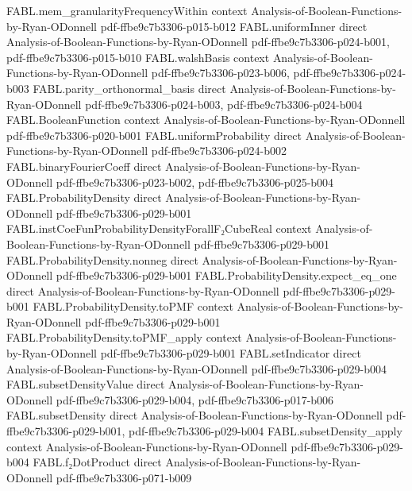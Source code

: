 \begin{theorem}
  {FABL.mem_granularityFrequencyWithin}
  {context}
  {Analysis-of-Boolean-Functions-by-Ryan-ODonnell}
  {pdf-ffbe9c7b3306-p015-b012}
\proofstep
  {FABL.uniformInner}
  {direct}
  {Analysis-of-Boolean-Functions-by-Ryan-ODonnell}
  {pdf-ffbe9c7b3306-p024-b001,
    pdf-ffbe9c7b3306-p015-b010}
\proofstep
  {FABL.walshBasis}
  {context}
  {Analysis-of-Boolean-Functions-by-Ryan-ODonnell}
  {pdf-ffbe9c7b3306-p023-b006,
    pdf-ffbe9c7b3306-p024-b003}
\proofstep
  {FABL.parity_orthonormal_basis}
  {direct}
  {Analysis-of-Boolean-Functions-by-Ryan-ODonnell}
  {pdf-ffbe9c7b3306-p024-b003,
    pdf-ffbe9c7b3306-p024-b004}
\proofstep
  {FABL.BooleanFunction}
  {context}
  {Analysis-of-Boolean-Functions-by-Ryan-ODonnell}
  {pdf-ffbe9c7b3306-p020-b001}
\proofstep
  {FABL.uniformProbability}
  {direct}
  {Analysis-of-Boolean-Functions-by-Ryan-ODonnell}
  {pdf-ffbe9c7b3306-p024-b002}
\proofstep
  {FABL.binaryFourierCoeff}
  {direct}
  {Analysis-of-Boolean-Functions-by-Ryan-ODonnell}
  {pdf-ffbe9c7b3306-p023-b002,
    pdf-ffbe9c7b3306-p025-b004}
\proofstep
  {FABL.ProbabilityDensity}
  {direct}
  {Analysis-of-Boolean-Functions-by-Ryan-ODonnell}
  {pdf-ffbe9c7b3306-p029-b001}
\proofstep
  {FABL.instCoeFunProbabilityDensityForallF₂CubeReal}
  {context}
  {Analysis-of-Boolean-Functions-by-Ryan-ODonnell}
  {pdf-ffbe9c7b3306-p029-b001}
\proofstep
  {FABL.ProbabilityDensity.nonneg}
  {direct}
  {Analysis-of-Boolean-Functions-by-Ryan-ODonnell}
  {pdf-ffbe9c7b3306-p029-b001}
\proofstep
  {FABL.ProbabilityDensity.expect_eq_one}
  {direct}
  {Analysis-of-Boolean-Functions-by-Ryan-ODonnell}
  {pdf-ffbe9c7b3306-p029-b001}
\proofstep
  {FABL.ProbabilityDensity.toPMF}
  {context}
  {Analysis-of-Boolean-Functions-by-Ryan-ODonnell}
  {pdf-ffbe9c7b3306-p029-b001}
\proofstep
  {FABL.ProbabilityDensity.toPMF_apply}
  {context}
  {Analysis-of-Boolean-Functions-by-Ryan-ODonnell}
  {pdf-ffbe9c7b3306-p029-b001}
\proofstep
  {FABL.setIndicator}
  {direct}
  {Analysis-of-Boolean-Functions-by-Ryan-ODonnell}
  {pdf-ffbe9c7b3306-p029-b004}
\proofstep
  {FABL.subsetDensityValue}
  {direct}
  {Analysis-of-Boolean-Functions-by-Ryan-ODonnell}
  {pdf-ffbe9c7b3306-p029-b004,
    pdf-ffbe9c7b3306-p017-b006}
\proofstep
  {FABL.subsetDensity}
  {direct}
  {Analysis-of-Boolean-Functions-by-Ryan-ODonnell}
  {pdf-ffbe9c7b3306-p029-b001,
    pdf-ffbe9c7b3306-p029-b004}
\proofstep
  {FABL.subsetDensity_apply}
  {context}
  {Analysis-of-Boolean-Functions-by-Ryan-ODonnell}
  {pdf-ffbe9c7b3306-p029-b004}
\proofstep
  {FABL.f₂DotProduct}
  {direct}
  {Analysis-of-Boolean-Functions-by-Ryan-ODonnell}
  {pdf-ffbe9c7b3306-p071-b009}

\end{theorem}
